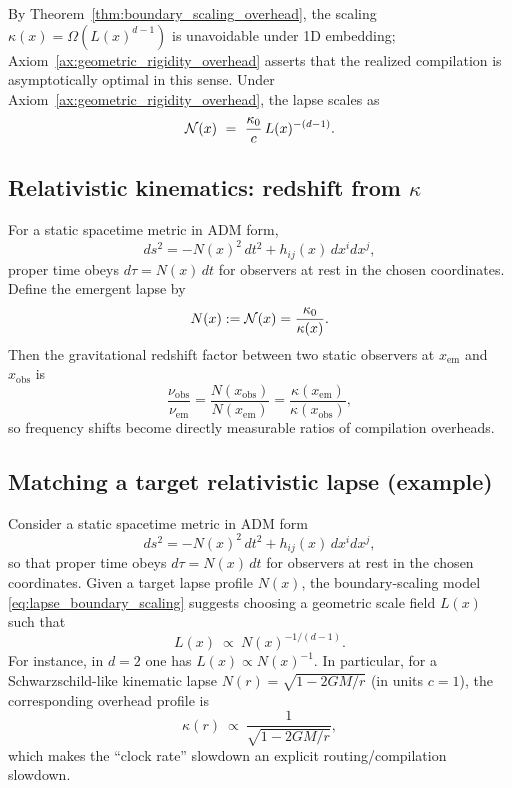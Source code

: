 By Theorem~\ref{thm:boundary_scaling_overhead}, the scaling $\kappa(x)=\Omega(L(x)^{d-1})$ is unavoidable under 1D embedding; Axiom~\ref{ax:geometric_rigidity_overhead} asserts that the realized compilation is asymptotically optimal in this sense.
Under Axiom~\ref{ax:geometric_rigidity_overhead}, the lapse scales as
\begin{equation}
\lapse(x)\ =\ \frac{\kappa_0}{c}\,L(x)^{-(d-1)}.
\label{eq:lapse_boundary_scaling}
\end{equation}

\subsection{Relativistic kinematics: redshift from \texorpdfstring{$\kappa$}{kappa}}
For a static spacetime metric in ADM form,
\begin{equation}
ds^2=-N(x)^2\,dt^2+h_{ij}(x)\,dx^idx^j,
\end{equation}
proper time obeys $d\tau = N(x)\,dt$ for observers at rest in the chosen coordinates.
Define the emergent lapse by
\begin{equation}
N(x):=\mathcal{N}(x)=\frac{\kappa_0}{\kappa(x)}.
\end{equation}
Then the gravitational redshift factor between two static observers at $x_{\mathrm{em}}$ and $x_{\mathrm{obs}}$ is
\begin{equation}
\frac{\nu_{\mathrm{obs}}}{\nu_{\mathrm{em}}}=\frac{N(x_{\mathrm{obs}})}{N(x_{\mathrm{em}})}
=\frac{\kappa(x_{\mathrm{em}})}{\kappa(x_{\mathrm{obs}})},
\end{equation}
so frequency shifts become directly measurable ratios of compilation overheads.

\subsection{Matching a target relativistic lapse (example)}
Consider a static spacetime metric in ADM form
\begin{equation}
ds^2=-N(x)^2\,dt^2+h_{ij}(x)\,dx^idx^j,
\end{equation}
so that proper time obeys $d\tau = N(x)\,dt$ for observers at rest in the chosen coordinates.
Given a target lapse profile $N(x)$, the boundary-scaling model \eqref{eq:lapse_boundary_scaling} suggests choosing a geometric scale field $L(x)$ such that
\begin{equation}
L(x)\ \propto\ N(x)^{-1/(d-1)}.
\end{equation}
For instance, in $d=2$ one has $L(x)\propto N(x)^{-1}$.
In particular, for a Schwarzschild-like kinematic lapse $N(r)=\sqrt{1-2GM/r}$ (in units $c=1$),
the corresponding overhead profile is
\begin{equation}
\kappa(r)\ \propto\ \frac{1}{\sqrt{1-2GM/r}},
\end{equation}
which makes the ``clock rate'' slowdown an explicit routing/compilation slowdown.


